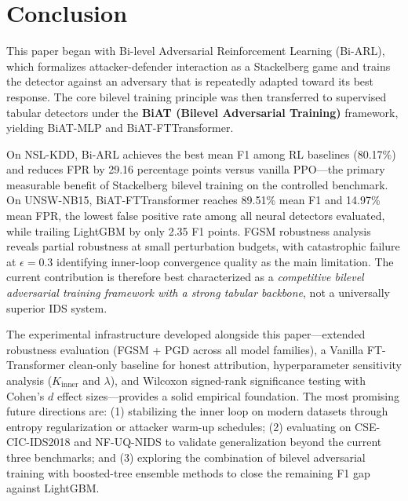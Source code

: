 \section{Conclusion}
\label{sec:conclusion}

This paper began with Bi-level Adversarial Reinforcement Learning (Bi-ARL), which formalizes attacker-defender interaction as a Stackelberg game and trains the detector against an adversary that is repeatedly adapted toward its best response. The core bilevel training principle was then transferred to supervised tabular detectors under the \textbf{BiAT (Bilevel Adversarial Training)} framework, yielding BiAT-MLP and BiAT-FTTransformer.

On NSL-KDD, Bi-ARL achieves the best mean F1 among RL baselines (80.17\%) and reduces FPR by 29.16 percentage points versus vanilla PPO---the primary measurable benefit of Stackelberg bilevel training on the controlled benchmark. On UNSW-NB15, BiAT-FTTransformer reaches 89.51\% mean F1 and 14.97\% mean FPR, the lowest false positive rate among all neural detectors evaluated, while trailing LightGBM by only 2.35 F1 points. FGSM robustness analysis reveals partial robustness at small perturbation budgets, with catastrophic failure at $\epsilon=0.3$ identifying inner-loop convergence quality as the main limitation. The current contribution is therefore best characterized as a \textit{competitive bilevel adversarial training framework with a strong tabular backbone}, not a universally superior IDS system.

The experimental infrastructure developed alongside this paper---extended robustness evaluation (FGSM + PGD across all model families), a Vanilla FT-Transformer clean-only baseline for honest attribution, hyperparameter sensitivity analysis ($K_{\text{inner}}$ and $\lambda$), and Wilcoxon signed-rank significance testing with Cohen's $d$ effect sizes---provides a solid empirical foundation. The most promising future directions are: (1) stabilizing the inner loop on modern datasets through entropy regularization or attacker warm-up schedules; (2) evaluating on CSE-CIC-IDS2018 \cite{sharafaldin2018cicids2018} and NF-UQ-NIDS \cite{sarhan2021nfuqnids} to validate generalization beyond the current three benchmarks; and (3) exploring the combination of bilevel adversarial training with boosted-tree ensemble methods to close the remaining F1 gap against LightGBM.
